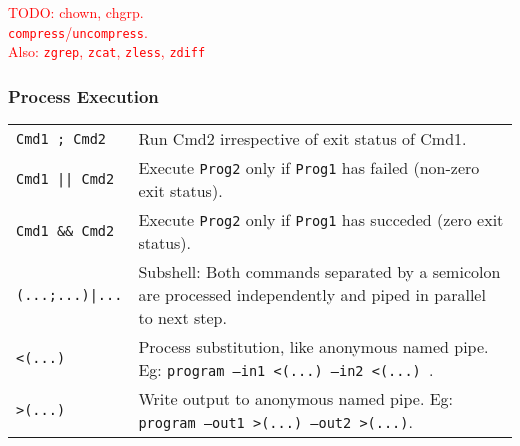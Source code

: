 \textcolor{red}{TODO: chown, chgrp.}\\
\textcolor{red}{\texttt{compress}/\texttt{uncompress}.\\ 
Also: \texttt{zgrep}, \texttt{zcat}, \texttt{zless}, \texttt{zdiff}}\\

\subsubsection{Process Execution}

\begin{tabularx}{\linewidth}{lX}

    \texttt{Cmd1 ; Cmd2}        & Run Cmd2 irrespective of exit status of Cmd1.\\
    \texttt{Cmd1 || Cmd2}       & Execute \texttt{Prog2} only if \texttt{Prog1} has failed (non-zero exit status).\\
    \texttt{Cmd1 \&\& Cmd2}     & Execute \texttt{Prog2} only if \texttt{Prog1} has succeded (zero exit status).\\
    \texttt{(...;...)|...}      & Subshell: Both commands separated by a semicolon are processed independently and piped in parallel to next step. \\
    \texttt{<(...)}             & Process substitution, like anonymous named pipe. Eg: \texttt{program --in1 <(...) --in2 <(...) }.\\
    \texttt{>(...)}             & Write output to anonymous named pipe. Eg: \texttt{program --out1 >(...) --out2 >(...)}.\\
    \hline

\end{tabularx}


